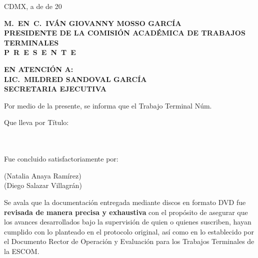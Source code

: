 \vspace{0.6cm}
\noindent CDMX, \underline{\hspace{1cm}} a \underline{\hspace{2cm}} de
\underline{\hspace{2.5cm}} de 20\underline{\hspace{0.8cm}}

\vspace{0.5cm}
\noindent\textbf{M.~EN~C.~IV\'AN GIOVANNY MOSSO GARC\'IA}\\
\textbf{PRESIDENTE DE LA COMISI\'ON ACAD\'EMICA DE TRABAJOS TERMINALES}\\
\textbf{P~R~E~S~E~N~T~E}

\vspace{0.2cm}
\hfill\begin{minipage}{0.48\textwidth}
  \textbf{EN ATENCI\'ON A:}\\
  \textbf{LIC.~MILDRED SANDOVAL GARC\'IA}\\
  \textbf{SECRETARIA EJECUTIVA}
\end{minipage}

\vspace{0.5cm}
\noindent Por medio de la presente, se informa que el Trabajo Terminal N\'um.
\underline{\hspace{2.5cm}}

\vspace{0.3cm}
\noindent Que lleva por T\'itulo:\\[0.2cm]
\underline{\hspace{\linewidth}}\\[0.15cm]
\underline{\hspace{\linewidth}}\\[0.15cm]
\underline{\hspace{\linewidth}}

\vspace{0.4cm}
\noindent Fue concluido satisfactoriamente por:

\vspace{0.3cm}
\begin{center}
  (Natalia Anaya Ram\'irez)\\[0.2cm]
  (Diego Salazar Villagr\'an)
\end{center}

\vspace{0.5cm}
\noindent Se avala que la documentaci\'on entregada mediante discos en formato DVD fue
\textbf{revisada de manera precisa y exhaustiva} con el prop\'osito de asegurar que los
avances desarrollados bajo la supervisi\'on de quien o quienes suscriben, hayan cumplido
con lo planteado en el protocolo original, as\'i como en lo establecido por el Documento
Rector de Operaci\'on y Evaluaci\'on para los Trabajos Terminales de la ESCOM.


